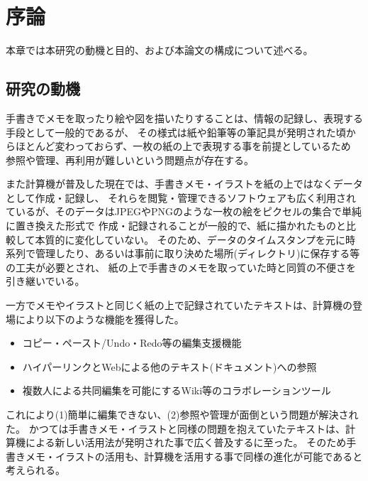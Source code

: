 \chapter{序論}
\label{chap:introduction}

本章では本研究の動機と目的、および本論文の構成について述べる。

\newpage

\section{研究の動機}

手書きでメモを取ったり絵や図を描いたりすることは、情報の記録し、表現する手段として一般的であるが、
その様式は紙や鉛筆等の筆記具が発明された頃からほとんど変わっておらず、一枚の紙の上で表現する事を前提としているため
参照や管理、再利用が難しいという問題点が存在する。


また計算機が普及した現在では、手書きメモ・イラストを紙の上ではなくデータとして作成・記録し、
それらを閲覧・管理できるソフトウェアも広く利用されているが、そのデータはJPEGやPNGのような一枚の絵をピクセルの集合で単純に置き換えた形式で
作成・記録されることが一般的で、紙に描かれたものと比較して本質的に変化していない。
そのため、データのタイムスタンプを元に時系列で管理したり、あるいは事前に取り決めた場所(ディレクトリ)に保存する等の工夫が必要とされ、
紙の上で手書きのメモを取っていた時と同質の不便さを引き継いでいる。

一方でメモやイラストと同じく紙の上で記録されていたテキストは、計算機の登場により以下のような機能を獲得した。

\begin{itemize}
    \item コピー・ペースト/Undo・Redo等の編集支援機能
    \item ハイパーリンクとWebによる他のテキスト(ドキュメント)への参照
    \item 複数人による共同編集を可能にするWiki等のコラボレーションツール
\end{itemize}

これにより(1)簡単に編集できない、(2)参照や管理が面倒という問題が解決された。
かつては手書きメモ・イラストと同様の問題を抱えていたテキストは、計算機による新しい活用法が発明された事で広く普及するに至った。
そのため手書きメモ・イラストの活用も、計算機を活用する事で同様の進化が可能であると考えられる。

